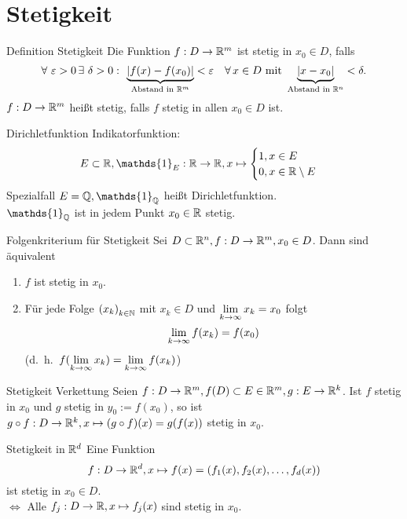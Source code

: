 \documentclass[main.tex]{subfiles}
\begin{document}
\section*{Stetigkeit}
\begin{karte}{Definition Stetigkeit}
    Die Funktion \( f: D\rightarrow \mathbb{R}^m \) ist stetig 
    in \( x_0 \in D \), falls
    \[ \forall \, \varepsilon > 0 \,\exists \, \delta > 0 
    \, \colon \, \underbrace{ \abs{ f(x) - f(x_0) 
    }}_{\text{Abstand in } \R^m} < \varepsilon \quad 
    \forall x\in D \text{ mit } \underbrace{\abs{x - x_0} 
    }_{\text{Abstand in } \R^n} < \delta. \]
    \( f: D\rightarrow \mathbb{R}^m \) heißt stetig, falls \( f \) 
    stetig in allen \(x_0 \in D \) ist.
\end{karte}
\begin{karte}{Dirichletfunktion}
    Indikatorfunktion:
    \[ E\subset \R, 
        \mathds{1}_E : \R\rightarrow\R, x\mapsto 
        \begin{cases}
        1, x\in E\\
        0, x\in\R \setminus E
    \end{cases} \]
    Spezialfall \( E = \Q, \mathds{1}_\Q \) heißt Dirichletfunktion.\\
    \( \mathds{1}_\Q \) ist in jedem Punkt \( x_0 \in \mathbb{R} \) stetig.
\end{karte}
\begin{karte}{Folgenkriterium für Stetigkeit}
    Sei \( D\subset \mathbb{R}^n, f:D\rightarrow \mathbb{R}^m, x_0 \in D \). Dann sind
    äquivalent
    \begin{enumerate}
        \item \( f \) ist stetig in \( x_0 \).
        \item Für jede Folge \( {(x_k)}_{k\in\mathbb{N}} \) mit \( x_k \in D \)
        und \( \lim\limits_{k\rightarrow\infty} x_k = x_0 \) folgt 
        \[ \lim\limits_{k\rightarrow\infty} f(x_k) = f(x_0) \]
        (d.\ h.\  \( f(\lim\limits_{k\rightarrow\infty} x_k) = \lim\limits_{k\rightarrow\infty} f(x_k) \))
    \end{enumerate}
\end{karte}
\begin{karte}{Stetigkeit Verkettung}
    Seien \( f:D\rightarrow \mathbb{R}^m, f(D) \subset E \in\mathbb{R}^m, 
    g: E\rightarrow\mathbb{R}^k \). Ist \( f \) stetig in \( x_0 \)
    und \( g \) stetig in \( y_0 := f(x_0) \), so ist 
    \( g \circ f : D\rightarrow \mathbb{R}^k, x \mapsto (g\circ f)(x) 
    = g(f(x)) \) stetig in \( x_0 \).
\end{karte}
\begin{karte}{Stetigkeit in \( \mathbb{R}^d \)}
    Eine Funktion \[ f: D\rightarrow \mathbb{R}^d, x\mapsto 
    f(x) = (f_1(x), f_2(x), \dots , f_d(x)) \]
    ist stetig in  \(x_0 \in D\).\\
    \( \Leftrightarrow \) Alle  
    \( f_j : D \rightarrow \mathbb{R}, x\mapsto f_j(x) \) 
    sind stetig in \( x_0 \).
\end{karte}
\end{document}
